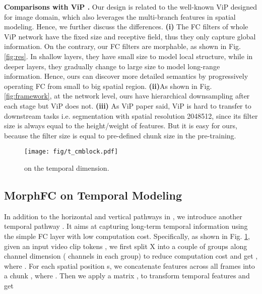 \documentclass[runningheads]{llncs}
\begin{document}
\noindent\textbf{Comparisons with ViP \cite{vip}.} Our design is related to the well-known ViP designed for image domain,
which also leverages the multi-branch features in spatial modeling. Hence, we further discuss the differences. 
\textbf{(i)} The
FC filters of whole ViP network have the fixed size and receptive field, thus they only capture global information. 
On the contrary, our FC filters are morphable, as shown in Fig. \ref{fig:res}. In shallow layers, they
have small size to model local structure, while in deeper layers, they gradually
change to large size to model long-range information. Hence, ours can discover more detailed semantics by progressively operating FC from small to big spatial region. 
\textbf{(ii)}As shown in Fig. \ref{fig:framework}, at the network level, ours have hierarchical downsampling after each stage but ViP does not. 
\textbf{(iii)} As ViP paper said, ViP is hard to transfer to downstream tasks
i.e. segmentation with spatial resolution 2048512,
since its filter size is always equal to the
height/weight of features. 
But it is easy for ours,
because the filter size is equal to pre-defined chunk size in the pre-training.










\begin{figure}[t]
\begin{center}
\texttt{[image: fig/t\_cmblock.pdf]}
\end{center}

\caption{
 on the temporal dimension.
}

\label{fig:t_cmblock}
\end{figure}
\subsection{MorphFC on Temporal Modeling}
 In addition to the horizontal and vertical pathways in , we introduce another temporal pathway . It aims at capturing long-term temporal information using the simple FC layer with low computation cost. 
 Specifically, as shown in Fig.  \ref{fig:t_cmblock}, given an input video clip tokens  , we first split X into a couple of groups  along channel dimension ( channels in each group) to reduce computation cost and get  , where . For each spatial position s, we concatenate features across all frames into a chunk  , where . Then we apply a  matrix ,  to transform temporal features and get 
\end{document}

